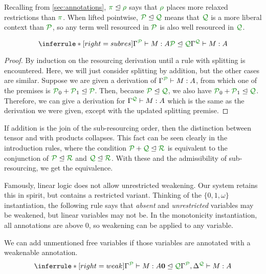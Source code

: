 Recalling from \autoref{sec:annotations}, $\rescomment \pi \subres \rescomment
\rho$ says that $\rescomment \rho$ places more relaxed restrictions than
$\rescomment \pi$.
When lifted pointwise, $\resctx P \subres \resctx Q$ means that
$\resctx Q$ is a more liberal context than $\resctx
 P$, so any term well resourced in $\resctx P$ is also well
resourced in $\resctx Q$.

\begin{lemma}
  \[
    \inferrule*[right=subres]{
      \ctx{\Gamma}{P} \vdash M : A
      \\ \resctx P \subres \resctx Q
    }
    {
      \ctx{\Gamma}{Q} \vdash M : A
    }
  \]
\end{lemma}
\begin{proof}
  By induction on the resourcing derivation until a rule with splitting is
  encountered.
  Here, we will just consider splitting by addition, but the other cases are
  similar.
  Suppose we are given a derivation of $\ctx{\Gamma}{P} \vdash M : A$,
  from which one of the premises is
  $\resctx P_0 + \resctx P_1 \subres \resctx P$.
  Then, because $\resctx P \subres \resctx Q$, we also have
  $\resctx P_0 + \resctx P_1 \subres \resctx Q$.
  Therefore, we can give a derivation for
  $\ctx{\Gamma}{Q} \vdash M : A$ which is the same as the derivation we
  were given, except with the updated splitting premise.
\end{proof}

If addition is the join of the sub-resourcing order, then the distinction
between tensor and with products collapses.
This fact can be seen clearly in the introduction rules, where the condition
$\resctx P + \resctx Q \subres \resctx R$ is equivalent to the conjunction of
$\resctx P \subres \resctx R$ and $\resctx Q \subres \resctx R$.
With these and the admissibility of sub-resourcing, we get the equivalence.

Famously, linear logic does not allow unrestricted weakening.
Our system retains this in spirit, but contains a restricted variant.
Thinking of the $\{0,1,\omega\}$ instantiation, the following rule says that
\emph{absent} and \emph{unrestricted} variables may be weakened, but linear
variables may not be.
In the monotonicity instantiation, all annotations are above $0$, so weakening
can be applied to any variable.

\begin{lemma}[Weakening]
  We can add unmentioned free variables if those variables are annotated with a
  weakenable annotation.
  \[
    \inferrule*[right=weak]{
      \ctx{\Gamma}{P} \vdash M : A
      \\ \vct 0 \subres \resctx Q
    }
    {
      \ctx{\Gamma}{P}, \ctx{\Delta}{Q} \vdash M : A
    }
  \]
\end{lemma}

